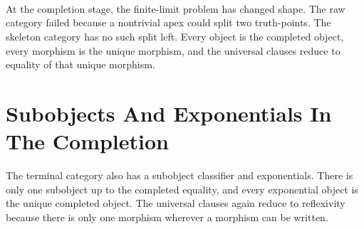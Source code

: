 \documentclass[11pt]{article}
\begin{document}
\begin{code}
\AgdaSpace{}%
\<%
\\
\>[0]\AgdaSpace{}%
\AgdaSymbol{=}\AgdaSpace{}%
\<%
\\
\>[0][@{}l@{\AgdaIndent{0}}]%
\>[2]\AgdaSymbol{\{}\AgdaSpace{}%
\AgdaSpace{}%
\AgdaSymbol{=}\AgdaSpace{}%
\AgdaSpace{}%
\AgdaSymbol{\{}\AgdaSymbol{\}}\AgdaSpace{}%
\AgdaSymbol{\{}\AgdaSymbol{\}}\AgdaSpace{}%
\AgdaSymbol{\{}\AgdaSymbol{\}}\AgdaSpace{}%
\AgdaSpace{}%
\AgdaSpace{}%
\AgdaSpace{}%
\AgdaSpace{}%
\AgdaSymbol{\{}\AgdaSymbol{\}}\AgdaSpace{}%
\AgdaSymbol{\{}\AgdaSymbol{\}}\AgdaSpace{}%
\AgdaSymbol{\{}\AgdaSymbol{\}}\AgdaSpace{}%
\AgdaSpace{}%
\<%
\\
%
\>[2]\AgdaSymbol{\}}\<%
\end{code}

At the completion stage, the finite-limit problem has changed shape.
The raw category failed because a nontrivial apex could split two
truth-points.  The skeleton category has no such split left.  Every
object is the completed object, every morphism is the unique morphism,
and the universal clauses reduce to equality of that unique morphism.

\section{Subobjects And Exponentials In The Completion}

The terminal category also has a subobject classifier and exponentials.
There is only one subobject up to the completed equality, and every
exponential object is the unique completed object.  The universal clauses
again reduce to reflexivity because there is only one morphism wherever a
morphism can be written.
\end{document}
